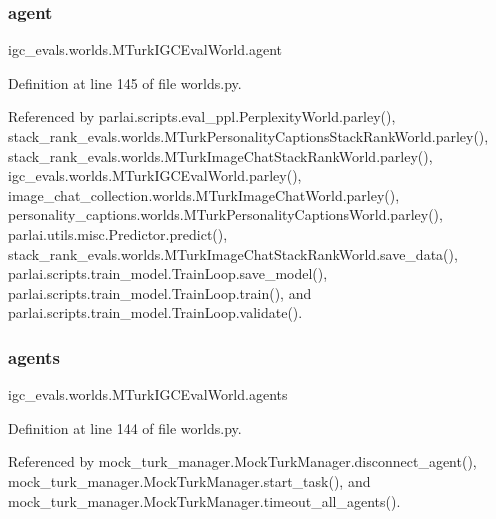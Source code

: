 \subsubsection{\texorpdfstring{agent}{agent}}
{\footnotesize\ttfamily igc\+\_\+evals.\+worlds.\+M\+Turk\+I\+G\+C\+Eval\+World.\+agent}



Definition at line 145 of file worlds.\+py.



Referenced by parlai.\+scripts.\+eval\+\_\+ppl.\+Perplexity\+World.\+parley(), stack\+\_\+rank\+\_\+evals.\+worlds.\+M\+Turk\+Personality\+Captions\+Stack\+Rank\+World.\+parley(), stack\+\_\+rank\+\_\+evals.\+worlds.\+M\+Turk\+Image\+Chat\+Stack\+Rank\+World.\+parley(), igc\+\_\+evals.\+worlds.\+M\+Turk\+I\+G\+C\+Eval\+World.\+parley(), image\+\_\+chat\+\_\+collection.\+worlds.\+M\+Turk\+Image\+Chat\+World.\+parley(), personality\+\_\+captions.\+worlds.\+M\+Turk\+Personality\+Captions\+World.\+parley(), parlai.\+utils.\+misc.\+Predictor.\+predict(), stack\+\_\+rank\+\_\+evals.\+worlds.\+M\+Turk\+Image\+Chat\+Stack\+Rank\+World.\+save\+\_\+data(), parlai.\+scripts.\+train\+\_\+model.\+Train\+Loop.\+save\+\_\+model(), parlai.\+scripts.\+train\+\_\+model.\+Train\+Loop.\+train(), and parlai.\+scripts.\+train\+\_\+model.\+Train\+Loop.\+validate().

\mbox{\label{classigc__evals_1_1worlds_1_1MTurkIGCEvalWorld_af9ffc523ad51ee58a30f5b9ddee453be}} 
\subsubsection{\texorpdfstring{agents}{agents}}
{\footnotesize\ttfamily igc\+\_\+evals.\+worlds.\+M\+Turk\+I\+G\+C\+Eval\+World.\+agents}



Definition at line 144 of file worlds.\+py.



Referenced by mock\+\_\+turk\+\_\+manager.\+Mock\+Turk\+Manager.\+disconnect\+\_\+agent(), mock\+\_\+turk\+\_\+manager.\+Mock\+Turk\+Manager.\+start\+\_\+task(), and mock\+\_\+turk\+\_\+manager.\+Mock\+Turk\+Manager.\+timeout\+\_\+all\+\_\+agents().

